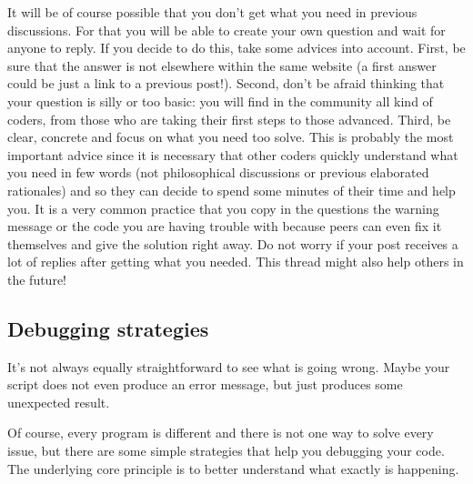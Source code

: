 It will be of course possible that you don't get what you need in previous discussions. For that you will be able to create your own question and wait for anyone to reply. If you decide to do this, take some advices into account. First, be sure that the answer is not elsewhere within the same website (a first answer could be just a link to a previous post!). Second, don't be afraid thinking that your question is silly or too basic: you will find in the community all kind of coders, from those who are taking their first steps to those advanced. Third, be clear, concrete and focus on what you need too solve. This is probably the most important advice since it is necessary that other coders quickly understand what you need in few words (not philosophical discussions or previous elaborated rationales) and so they can decide to spend some minutes of their time and help you. It is a very common practice that you copy in the questions the warning message or the code you are having trouble with because peers can even fix it themselves and give the solution right away. Do not worry if your post receives a lot of replies after getting what you needed. This thread might also help others in the future!


\subsection{Debugging strategies}

It's not always equally straightforward to see what is going
wrong. Maybe your script does not even produce an error
message, but just produces some unexpected result.

Of course, every program is different and there is not one
way to solve every issue, but there are some simple strategies
that help you debugging your code. The underlying core
principle is to better understand what exactly is happening.

